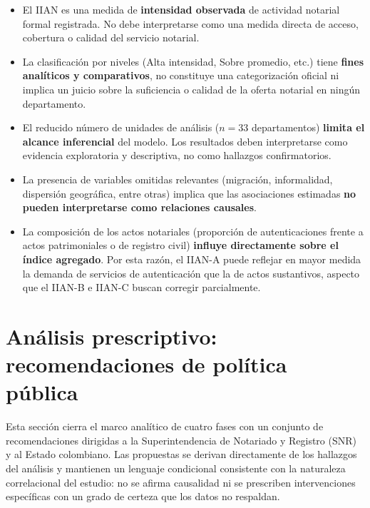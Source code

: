 \documentclass{article}
\begin{document}
\begin{itemize}
    \item El IIAN es una medida de \textbf{intensidad observada} de
    actividad notarial formal registrada. No debe interpretarse como
    una medida directa de acceso, cobertura o calidad del servicio
    notarial.

    \item La clasificación por niveles (Alta intensidad, Sobre promedio,
    etc.) tiene \textbf{fines analíticos y comparativos}, no constituye
    una categorización oficial ni implica un juicio sobre la suficiencia
    o calidad de la oferta notarial en ningún departamento.

    \item El reducido número de unidades de análisis ($n = 33$
    departamentos) \textbf{limita el alcance inferencial} del modelo.
    Los resultados deben interpretarse como evidencia exploratoria y
    descriptiva, no como hallazgos confirmatorios.

    \item La presencia de variables omitidas relevantes (migración,
    informalidad, dispersión geográfica, entre otras) implica que las
    asociaciones estimadas \textbf{no pueden interpretarse como
    relaciones causales}.

    \item La composición de los actos notariales (proporción de
    autenticaciones frente a actos patrimoniales o de registro civil)
    \textbf{influye directamente sobre el índice agregado}. Por esta
    razón, el IIAN-A puede reflejar en mayor medida la demanda de
    servicios de autenticación que la de actos sustantivos, aspecto que
    el IIAN-B e IIAN-C buscan corregir parcialmente.
\end{itemize}

\newpage
\section{Análisis prescriptivo: recomendaciones de política pública}
\label{sec:recomendaciones}

Esta sección cierra el marco analítico de cuatro fases con un
conjunto de recomendaciones dirigidas a la Superintendencia de
Notariado y Registro (SNR) y al Estado colombiano. Las propuestas se
derivan directamente de los hallazgos del análisis y mantienen un
lenguaje condicional consistente con la naturaleza correlacional del
estudio: no se afirma causalidad ni se prescriben intervenciones
específicas con un grado de certeza que los datos no respaldan.
\end{document}

